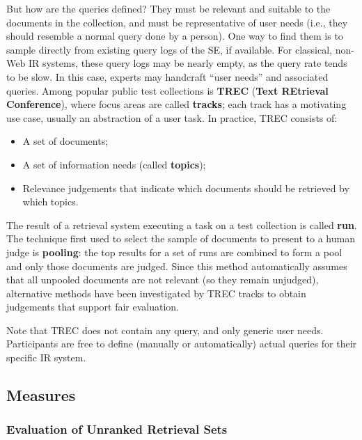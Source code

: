 But how are the queries defined? They must be relevant and suitable to the documents in the collection, and must be representative of user needs (i.e., they should resemble a normal query done by a person). One way to find them is to sample directly from existing query logs of the SE, if available. For classical, non-Web IR systems, these query logs may be nearly empty, as the query rate tends to be slow. In this case, experts may handcraft ``user needs'' and associated queries. Among popular public test collections is \textbf{TREC} (\textbf{Text REtrieval Conference}), where focus areas are called \textbf{tracks}; each track has a motivating use case, usually an abstraction of a user task. In practice, TREC consists of:
\begin{itemize}
    \item A set of documents;
    \item A set of information needs (called \textbf{topics});
    \item Relevance judgements that indicate which documents should be retrieved by which topics.
\end{itemize}
The result of a retrieval system executing a task on a test collection is called \textbf{run}. The technique first used to select the sample of documents to present to a human judge is \textbf{pooling}: the top results for a set of runs are combined to form a pool and only those documents are judged. Since this method automatically assumes that all unpooled documents are not relevant (so they remain unjudged), alternative methods have been investigated by TREC tracks to obtain judgements that support fair evaluation.

Note that TREC does not contain any query, and only generic user needs. Participants are free to define (manually or automatically) actual queries for their specific IR system.

\subsection{Measures}

\subsubsection{Evaluation of Unranked Retrieval Sets}

